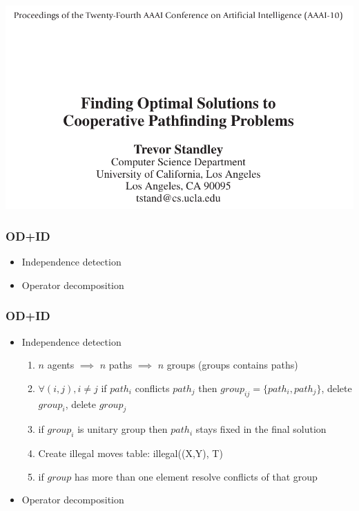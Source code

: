 \documentclass{beamer}
\begin{document}
\begin{frame}
\centering
\includegraphics[scale=0.3]{OD+ID.png}
\end{frame}

\begin{frame}
\frametitle{OD+ID}
\begin{itemize} 
\item Independence detection
\item Operator decomposition
\end{itemize} 
\end{frame}

\begin{frame}
\frametitle{OD+ID}
\begin{itemize} 
\item Independence detection
\begin{enumerate}
\item $n$ agents $\implies$ $n$ paths $\implies$ $n$ groups (groups contains paths)
\item $\forall (i,j), i \neq j$ if $path_i$ conflicts $path_j$ then $group_{ij} = \{path_i, path_j\}$, delete $group_i$, delete $group_j$
\item  if $group_i$ is unitary group then $path_i$ stays fixed in the final solution
\item Create illegal moves table: illegal((X,Y), T)
\item if $group$ has more than one element resolve conflicts of that group
\end{enumerate}
\item Operator decomposition
\end{itemize}
\end{frame}
\end{document}
